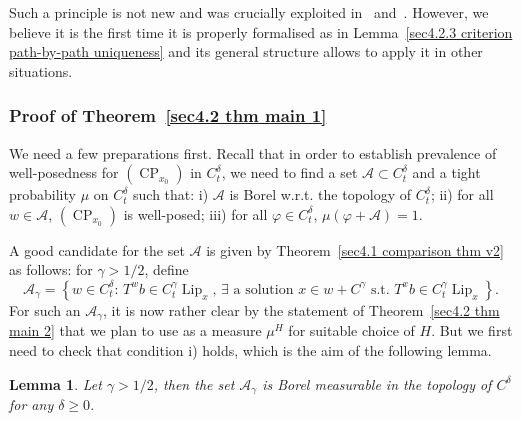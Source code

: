 \documentclass[10pt]{article}
\newcommand{\tmop}[1]{\ensuremath{\operatorname{#1}}}
\newtheorem{lemma}{Lemma}
\begin{document}
Such a principle is not new and was crucially exploited in~{\cite{davie}}
and~{\cite{catelliergubinelli}}. However, we believe it is the first time it
is properly formalised as in Lemma~\ref{sec4.2.3 criterion path-by-path
uniqueness} and its general structure allows to apply it in other situations.

\subsubsection{Proof of Theorem~\ref{sec4.2 thm main 1}}\label{sec4.2.1}

We need a few preparations first. Recall that in order to establish prevalence
of well-posedness for $(\tmop{CP}_{x_0})$ in $C_t^{\delta}$, we need to find a
set $\mathcal{A} \subset C_t^{\delta}$ and a tight probability $\mu$ on
$C_t^{\delta}$ such that: i) $\mathcal{A}$ is Borel w.r.t. the topology of
$C_t^{\delta}$; ii) for all $w \in \mathcal{A}$, $(\tmop{CP}_{x_0})$ is
well-posed; iii) for all $\varphi \in C_t^{\delta}$, $\mu (\varphi +
\mathcal{A}) = 1$.

A good candidate for the set $\mathcal{A}$ is given by Theorem~\ref{sec4.1
comparison thm v2} as follows: for $\gamma > 1 / 2$, define
\begin{equation}
  \mathcal{A}_{\gamma} = \left\{ w \in C^{\delta}_t : \, T^w b \in
  C^{\gamma}_t \tmop{Lip}_x,\,\exists \text{ a solution $x \in w +
  C^{\gamma}$ s.t. } T^x b \in C^{\gamma}_t \tmop{Lip}_x \right\} .
  \label{sec4.2.1 defn set}
\end{equation}
For such an $\mathcal{A}_{\gamma}$, it is now rather clear by the statement of
Theorem~\ref{sec4.2 thm main 2} that we plan to use as a measure $\mu^H$ for
suitable choice of $H$. But we first need to check that condition i) holds,
which is the aim of the following lemma.

\begin{lemma}
  \label{sec4.2.1 lemma borel set uniqueness}Let $\gamma > 1 / 2$, then the
  set $\mathcal{A}_{\gamma}$ is Borel measurable in the topology of
  $C^{\delta}$ for any $\delta \geqslant 0$.
\end{lemma}
\end{document}
